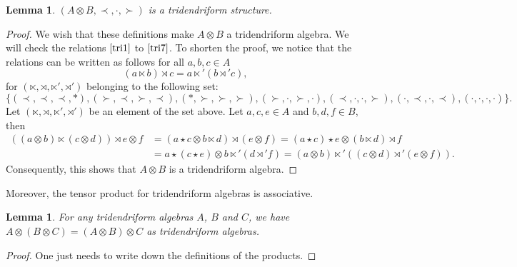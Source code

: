 \documentclass[10pt,a4paper]{amsart}
\numberwithin{equation}{section}
\theoremstyle{definition}
\theoremstyle{plain}
\newtheorem{Lemme}[defi]{Lemma}
\begin{document}
 \begin{Lemme}\label{lem:tritens}
 	$(A\otimes B,\prec,\cdot,\succ)$ is a tridendriform structure.
 \end{Lemme}
\begin{proof}
 We wish that these definitions make $A\otimes B$ a tridendriform algebra.
 We will check the relations $\eqref{tri1}$ to $\eqref{tri7}$.
 To shorten the proof, we notice that the relations can be written as follows for all $a,b,c\in A$
 \begin{equation*}
 	(a\ltimes b)\rtimes c = a\ltimes' (b\rtimes' c),
 \end{equation*}
 for $(\ltimes, \rtimes, \ltimes', \rtimes')$ belonging to the following set:
 \begin{equation} 	
 	\{ (\prec,\prec, \prec,*),(\succ,\prec,\succ,\prec),(*,\succ,\succ,\succ),(\succ,\cdot,\succ,\cdot),(\prec,\cdot, \cdot,\succ),(\cdot, \prec,\cdot, \prec),(\cdot,\cdot,\cdot,\cdot) \}. \label{quadru}
 \end{equation}
 Let $(\ltimes,\rtimes,\ltimes',\rtimes')$ be an element of the set above. Let $a,c,e\in A$ and $b,d,f\in B$, then
 \begin{align*}
 	((a\otimes b) \ltimes (c\otimes d))\rtimes e\otimes f &=(a\star c \otimes b\ltimes d) \rtimes (e\otimes f)
 												 =(a\star c)\star e \otimes (b\ltimes d) \rtimes f \\
 												 &= a\star (c\star e) \otimes b\ltimes'(d \rtimes' f)
 												 = (a\otimes b)\ltimes'((c\otimes d) \rtimes' (e\otimes f)).
 \end{align*}
 Consequently, this shows that $A\otimes B$ is a tridendriform algebra.
 \end{proof}

Moreover, the tensor product for tridendriform algebras is associative.
 \begin{Lemme}\label{lem:tritensass}
 	For any tridendriform algebras $A$, $B$ and $C$, we have $A\otimes(B\otimes C)=(A\otimes B)\otimes C$ as tridendriform algebras.
 \end{Lemme}
\begin{proof}
One just needs to write down the definitions of the products.
 \end{proof}
\end{document}
